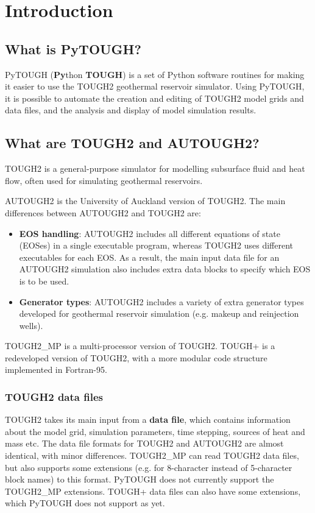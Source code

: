 \chapter{Introduction}

\section{What is PyTOUGH?}

PyTOUGH (\textbf{Py}thon \textbf{TOUGH}) is a set of Python software routines for making it easier to use the TOUGH2 geothermal reservoir simulator. Using PyTOUGH, it is possible to automate the creation and editing of TOUGH2 model grids and data files, and the analysis and display of model simulation results.

\section{What are TOUGH2 and AUTOUGH2?}

TOUGH2 \citep{tough2} is a general-purpose simulator for modelling subsurface fluid and heat flow, often used for simulating geothermal reservoirs.

AUTOUGH2 is the University of Auckland version of TOUGH2.  The main differences between AUTOUGH2 and TOUGH2 are:

\begin{itemize}
  \item \textbf{EOS handling}: AUTOUGH2 includes all different equations of state (EOSes) in a single executable program, whereas TOUGH2 uses different executables for each EOS.  As a result, the main input data file for an AUTOUGH2 simulation also includes extra data blocks to specify which EOS is to be used.
  \item \textbf{Generator types}: AUTOUGH2 includes a variety of extra generator types developed for geothermal reservoir simulation (e.g. makeup and reinjection wells).
\end{itemize}

TOUGH2\_MP \citep{tough2mp} is a multi-processor version of TOUGH2.  TOUGH+ is a redeveloped version of TOUGH2, with a more modular code structure implemented in Fortran-95.

\subsection{TOUGH2 data files}

TOUGH2 takes its main input from a \textbf{data file}, which contains information about the model grid, simulation parameters, time stepping, sources of heat and mass etc.  The data file formats for TOUGH2 and AUTOUGH2 are almost identical, with minor differences.  TOUGH2\_MP can read TOUGH2 data files, but also supports some extensions (e.g. for 8-character instead of 5-character block names) to this format.  PyTOUGH does not currently support the TOUGH2\_MP extensions.  TOUGH+ data files can also have some extensions, which PyTOUGH does not support as yet.

